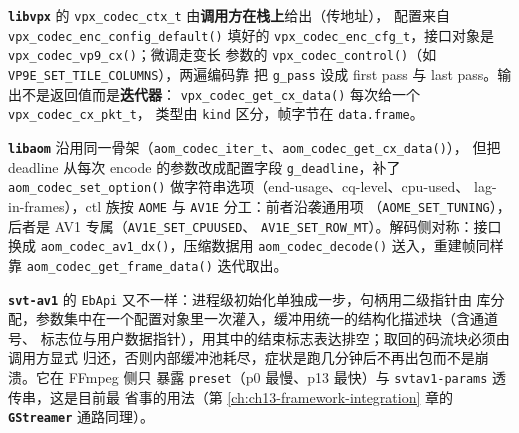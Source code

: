 \documentclass[12pt,a4paper,fontset=fandol]{ctexbook}
\newcommand{\Fn}[1]{\texttt{#1()}}
\newcommand{\Tp}[1]{\texttt{#1}}
\newcommand{\Bk}{\discretionary{}{}{}}
\newcommand{\Lib}[1]{\textbf{\texttt{#1}}}
\begin{document}
\Lib{libvpx} 的 \Tp{vpx\_{\Bk}codec\_{\Bk}ctx\_{\Bk}t} 由\textbf{调用方在栈上}给出（传地址），
配置来自 \Fn{vpx\_{\Bk}codec\_{\Bk}enc\_{\Bk}config\_{\Bk}default} 填好的
\Tp{vpx\_{\Bk}codec\_{\Bk}enc\_{\Bk}cfg\_{\Bk}t}，接口对象是 \Fn{vpx\_{\Bk}codec\_{\Bk}vp9\_{\Bk}cx}；微调走变长
参数的 \Fn{vpx\_{\Bk}codec\_{\Bk}control}（如 \Tp{VP9E\_{\Bk}SET\_{\Bk}TILE\_{\Bk}COLUMNS}），两遍编码靠
把 \Tp{g\_pass} 设成 first pass 与 last pass。输出不是返回值而是\textbf{迭代器}：
\Fn{vpx\_{\Bk}codec\_{\Bk}get\_{\Bk}cx\_{\Bk}data} 每次给一个 \Tp{vpx\_{\Bk}codec\_{\Bk}cx\_{\Bk}pkt\_{\Bk}t}，
类型由 \Tp{kind} 区分，帧字节在 \Tp{data.frame}。

\Lib{libaom} 沿用同一骨架（\Tp{aom\_codec\_iter\_t}、\Fn{aom\_codec\_get\_cx\_data}），
但把 deadline 从每次 encode 的参数改成配置字段 \Tp{g\_deadline}，补了
\Fn{aom\_codec\_set\_option} 做字符串选项（end-usage、cq-level、cpu-used、
lag-in-frames），ctl 族按 \Tp{AOME} 与 \Tp{AV1E} 分工：前者沿袭通用项
（\Tp{AOME\_SET\_TUNING}），后者是 AV1 专属（\Tp{AV1E\_SET\_CPUUSED}、
\Tp{AV1E\_SET\_ROW\_MT}）。解码侧对称：接口换成 \Fn{aom\_codec\_av1\_dx}，压缩数据用
\Fn{aom\_codec\_decode} 送入，重建帧同样靠 \Fn{aom\_codec\_get\_frame\_data} 迭代取出。

\Lib{svt-av1} 的 \Tp{EbApi} 又不一样：进程级初始化单独成一步，句柄用二级指针由
库分配，参数集中在一个配置对象里一次灌入，缓冲用统一的结构化描述块（含通道号、
标志位与用户数据指针），用其中的结束标志表达排空；取回的码流块必须由调用方显式
归还，否则内部缓冲池耗尽，症状是跑几分钟后不再出包而不是崩溃。它在 FFmpeg 侧只
暴露 \Tp{preset}（p0 最慢、p13 最快）与 \Tp{svtav1-params} 透传串，这是目前最
省事的用法（第 \ref{ch:ch13-framework-integration} 章的 \Lib{GStreamer} 通路同理）。
\end{document}
